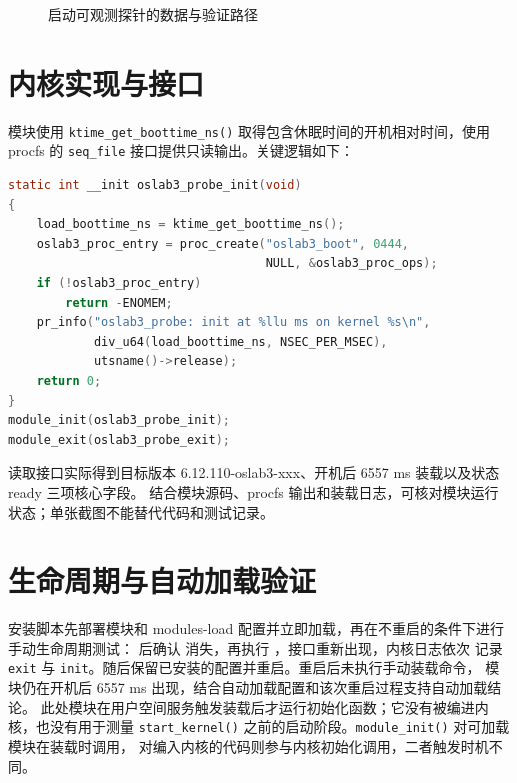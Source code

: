 \documentclass[UTF8,zihao=-4,openany,fontset=none]{ctexrep}
\newcommand{\kernelver}{6.12.110-oslab3-xxx}
\begin{document}
\begin{figure}[H]
  \centering
  \caption{启动可观测探针的数据与验证路径}
\end{figure}

\section{内核实现与接口}
模块使用 \texttt{ktime\_get\_boottime\_ns()} 取得包含休眠时间的开机相对时间，使用 procfs 的
\texttt{seq\_file} 接口提供只读输出。关键逻辑如下：
\begin{lstlisting}[language=C]
static int __init oslab3_probe_init(void)
{
    load_boottime_ns = ktime_get_boottime_ns();
    oslab3_proc_entry = proc_create("oslab3_boot", 0444,
                                    NULL, &oslab3_proc_ops);
    if (!oslab3_proc_entry)
        return -ENOMEM;
    pr_info("oslab3_probe: init at %llu ms on kernel %s\n",
            div_u64(load_boottime_ns, NSEC_PER_MSEC),
            utsname()->release);
    return 0;
}
module_init(oslab3_probe_init);
module_exit(oslab3_probe_exit);
\end{lstlisting}
读取接口实际得到目标版本 \kernelver、开机后 6557 ms 装载以及状态 ready 三项核心字段。
结合模块源码、procfs 输出和装载日志，可核对模块运行状态；单张截图不能替代代码和测试记录。

\section{生命周期与自动加载验证}
安装脚本先部署模块和 modules-load 配置并立即加载，再在不重启的条件下进行手动生命周期测试： 后确认
 消失，再执行 ，接口重新出现，内核日志依次
记录 \texttt{exit} 与 \texttt{init}。随后保留已安装的配置并重启。重启后未执行手动装载命令，
模块仍在开机后 6557 ms 出现，结合自动加载配置和该次重启过程支持自动加载结论。
此处模块在用户空间服务触发装载后才运行初始化函数；它没有被编进内核，也没有用于测量
\texttt{start\_kernel()} 之前的启动阶段。\texttt{module\_init()} 对可加载模块在装载时调用，
对编入内核的代码则参与内核初始化调用，二者触发时机不同。
\end{document}
